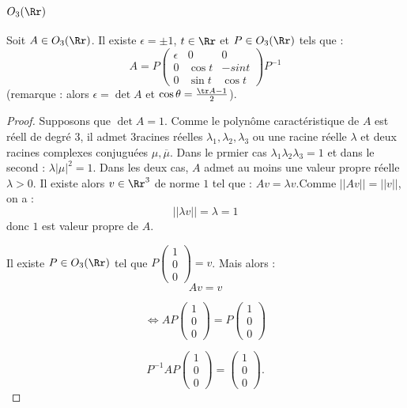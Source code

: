 \documentclass[class=report,crop=false]{standalone}
\begin{document}
\subsection{\boldmath $O_3(\Rr)$}

\begin{theoreme}
Soit $A \in O_3(\Rr)$. Il existe $\epsilon = \pm 1$, $t \in \Rr$ et $P\in O_3(\Rr)$ tels que :
\[A=P\left(\begin{array}{ccc}
\epsilon & 0 & 0\\
0 & \cos t & -sin t\\
0 & \sin t & \cos t
\end{array}\right)P^{-1}\] 
(remarque : alors $\epsilon = \det A$ et $\cos \theta = \frac{\tr A -1}{2}$).
\end{theoreme}

\begin{proof}
Supposons que $\det A =1$. Comme le polynôme caractéristique de $A$ est réell de degré $3$, il admet $3$racines réelles $ \lambda_1,\lambda_2,\lambda_3$ ou une racine réelle $\lambda$ et deux racines complexes conjuguées $\mu,\overline{\mu}$. Dans le prmier cas $\lambda_1\lambda_2\lambda_3 =1$ et dans le second : $\lambda|\mu|^2 = 1$. Dans les deux cas, $A$ admet au moins une valeur propre réelle $\lambda >0$. Il existe alors $v \in \Rr^3$ de norme $1$ tel que : $Av=\lambda v$.Comme $||Av|| = ||v||$, on a :
\[||\lambda v || = \lambda =1\]
donc $1$ est valeur propre de $A$.

Il existe $P\in O_3(\Rr)$ tel que $P\left(\begin{array}{c}
1\\
0\\
0
\end{array}\right) = v$. Mais alors :
\[Av=v\]

\[\iff AP\left(\begin{array}{c}
1\\
0\\
0
\end{array}\right) = P\left(\begin{array}{c}
1\\
0\\
0
\end{array}\right) \]

\[P^{-1} AP \left(\begin{array}{c}
1\\
0\\
0
\end{array}\right)  = \left(\begin{array}{c}
1\\
0\\
0
\end{array}\right) .\]


\end{proof}
\end{document}

